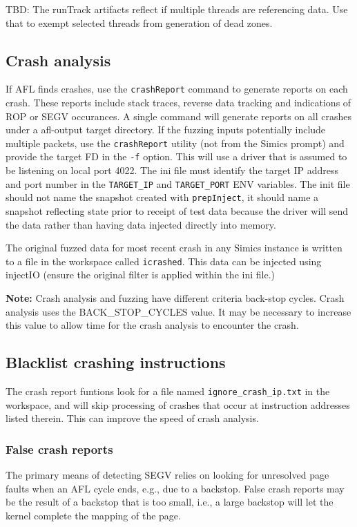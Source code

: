 \documentclass[titlepage]{article}
\begin{document}
TBD: The runTrack artifacts reflect if multiple threads are referencing data. Use that to exempt selected threads from generation of dead zones.

\subsection{Crash analysis}
If AFL finds crashes, use the {\tt crashReport} command to generate reports on each crash.  These reports include stack traces, reverse
data tracking and indications of ROP or SEGV occurances.  A single command will generate reports on all crashes under a afl-output target
directory.  If the fuzzing inputs potentially include multiple packets, use the {\tt crashReport} utility (not from the Simics prompt) and provide
the target FD in the {\tt -f} option.  This will use a driver that is assumed to be listening on local port 4022.  The ini file must identify the target IP
address and port number in the {\tt TARGET\_IP} and {\tt TARGET\_PORT} ENV variables.  The init file should not name the snapshot created with {\tt prepInject},
it should name a snapshot reflecting state prior to receipt of test data because the driver will send the data rather than having data injected directly into 
memory.

The original fuzzed data for most recent crash in any Simics instance is written to a file in the workspace called {\tt icrashed}.  This data can be injected using
injectIO (ensure the original filter is applied within the ini file.)

\textbf{Note:} Crash analysis and fuzzing have different criteria back-stop cycles.  Crash analysis uses the BACK\_STOP\_CYCLES value.  It may be necessary to increase this 
value to allow time for the crash analysis to encounter the crash.

\subsection{Blacklist crashing instructions}
The crash report funtions look for a file named {\tt ignore\_crash\_ip.txt} in the workspace, and will skip processing of crashes that occur at instruction
addresses listed therein.  This can improve the speed of crash analysis.

\subsubsection{False crash reports}
The primary means of detecting SEGV relies on looking for unresolved page faults when an AFL cycle ends, e.g., due to a backstop.
False crash reports may be the result of a backstop that is too small, i.e., a large backstop will let the kernel complete the
mapping of the page.
\end{document}

